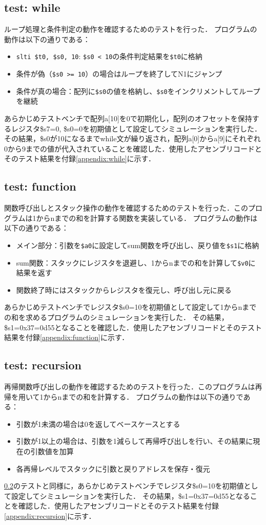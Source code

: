 \documentclass[dvipdfmx]{jsarticle}
\begin{document}
\subsection{test: while}
ループ処理と条件判定の動作を確認するためのテストを行った．
プログラムの動作は以下の通りである：
\begin{itemize}
\item \texttt{slti \$t0, \$s0, 10}: \texttt{\$s0 < 10}の条件判定結果を\texttt{\$t0}に格納
\item 条件が偽（\texttt{\$s0 >= 10}）の場合はループを終了してN1にジャンプ
\item 条件が真の場合：配列に\texttt{\$s0}の値を格納し、\texttt{\$s0}をインクリメントしてループを継続
\end{itemize}
あらかじめテストベンチで配列a[10]を0で初期化し，配列のオフセットを保持するレジスタ\$s7=0, \$s0=0を初期値として設定してシミュレーションを実行した．
その結果，\$s0が10になるまでwhile文が繰り返され，配列a[0]からa[9]にそれぞれ0から9までの値が代入されていることを確認した．使用したアセンブリコードとそのテスト結果を付録\ref{appendix:while}に示す．

\subsection{test: function}
\label{sec:function}
関数呼び出しとスタック操作の動作を確認するためのテストを行った．このプログラムは1からnまでの和を計算する関数を実装している．
プログラムの動作は以下の通りである：
\begin{itemize}
\item メイン部分：引数を\texttt{\$a0}に設定してsum関数を呼び出し、戻り値を\texttt{\$s1}に格納
\item sum関数：スタックにレジスタを退避し、1からnまでの和を計算して\texttt{\$v0}に結果を返す
\item 関数終了時にはスタックからレジスタを復元し、呼び出し元に戻る
\end{itemize}
あらかじめテストベンチでレジスタ\$s0=10を初期値として設定して1からnまでの和を求めるプログラムのシミュレーションを実行した．
その結果，\$s1=0x37=0d55となることを確認した．使用したアセンブリコードとそのテスト結果を付録\ref{appendix:function}に示す．

\subsection{test: recursion}
再帰関数呼び出しの動作を確認するためのテストを行った．このプログラムは再帰を用いて1からnまでの和を計算する．
プログラムの動作は以下の通りである：
\begin{itemize}
\item 引数が1未満の場合は0を返してベースケースとする
\item 引数が1以上の場合は、引数を1減らして再帰呼び出しを行い、その結果に現在の引数値を加算
\item 各再帰レベルでスタックに引数と戻りアドレスを保存・復元
\end{itemize}
\ref{sec:function}のテストと同様に，あらかじめテストベンチでレジスタ\$s0=10を初期値として設定してシミュレーションを実行した．
その結果，\$s1=0x37=0d55となることを確認した．使用したアセンブリコードとそのテスト結果を付録\ref{appendix:recursion}に示す．
\end{document}
